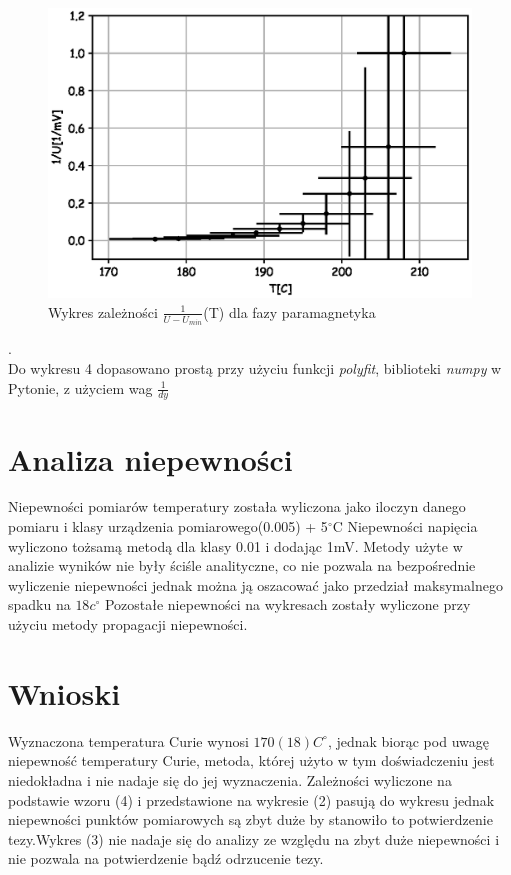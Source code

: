 \documentclass[a4paper,10pt]{article}
\begin{document}
\begin{figure}[H]
  \includegraphics{./Curie_odjete.eps}
  \caption{Wykres zależności $\frac{1}{U-U_{min}}$(T) dla fazy paramagnetyka}
\end{figure}.
\\Do wykresu 4 dopasowano prostą przy użyciu funkcji \emph{polyfit}, biblioteki \emph{numpy} w Pytonie, z
użyciem wag $\frac{1}{dy}$
\\

\section{Analiza niepewności}
Niepewności pomiarów temperatury została wyliczona jako iloczyn danego pomiaru i klasy urządzenia pomiarowego(0.005) + 5$^\circ$C
Niepewności napięcia wyliczono tożsamą metodą dla klasy 0.01 i dodając 1mV. Metody użyte w analizie wyników nie były ściśle analityczne, co nie pozwala na bezpośrednie wyliczenie niepewności jednak można ją oszacować jako przedział maksymalnego spadku na $18c^\circ$ Pozostałe niepewności na wykresach zostały wyliczone przy użyciu metody propagacji niepewności.

\section{Wnioski}
Wyznaczona temperatura Curie wynosi $170(18)C^\circ$, jednak biorąc pod uwagę niepewność temperatury Curie, metoda, której użyto w tym doświadczeniu jest niedokładna i  nie nadaje się do jej wyznaczenia. Zależności wyliczone na podstawie wzoru (4) i przedstawione na wykresie (2) pasują do wykresu jednak niepewności punktów pomiarowych są zbyt duże by stanowiło to potwierdzenie tezy.Wykres (3) nie nadaje się do analizy ze względu na zbyt duże niepewności i nie pozwala na potwierdzenie bądź odrzucenie tezy.
\end{document}
